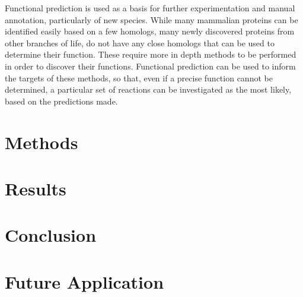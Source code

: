 \documentclass[12pt]{report}
\begin{document}
		Functional prediction is used as a basis for further experimentation and manual annotation, particularly of new species.  While many mammalian proteins can be identified easily based on a few homologs, many newly discovered proteins from other branches of life, do not have any close homologs that can be used to determine their function.  These require more in depth methods to be performed in order to discover their functions.  Functional prediction can be used to inform the targets of these methods, so that, even if a precise function cannot be determined, a particular set of reactions can be investigated as the most likely, based on the predictions made. %
		
	\section{Methods}
		
		
		
	\section{Results}
		
		
				
	\section{Conclusion}
		
		
		
	\section{Future Application}
		
		
		
\pagebreak

	{}
	
\end{document}
